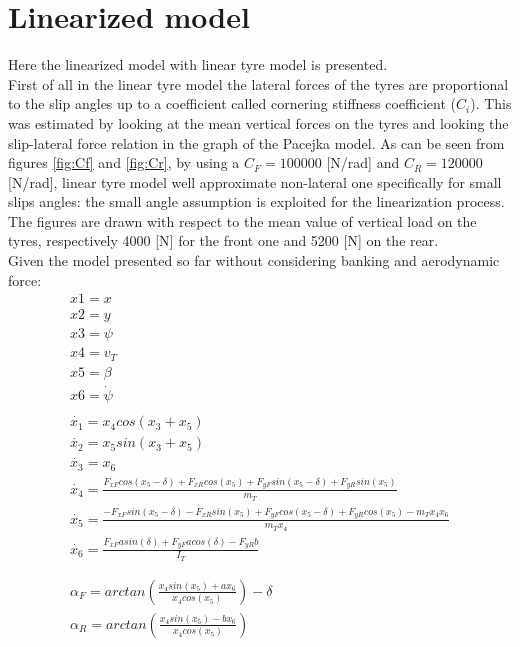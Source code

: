\documentclass{report}
\let\Oldsection\section
\renewcommand{\section}{\FloatBarrier\Oldsection}
\begin{document}
\section{Linearized model}
Here the linearized model with linear tyre model is presented.
\\First of all in the linear tyre model the lateral forces of the tyres are proportional to the slip angles up to a coefficient called cornering stiffness coefficient ($C_i$). This was estimated by looking at the mean vertical forces on the tyres and looking the slip-lateral force relation in the graph of the Pacejka model. As can be seen from figures \ref{fig:Cf} and \ref{fig:Cr}, by using a $C_F = 100000$ [N/rad] and $C_R = 120000$ [N/rad], linear tyre model well approximate non-lateral one specifically for small slips angles: the small angle assumption is exploited for the linearization process. The figures are drawn with respect to the mean value of vertical load on the tyres, respectively 4000 [N] for the front one and 5200 [N] on the rear.
\\Given the model presented so far without considering banking and aerodynamic force:
\begin{equation}
\begin{aligned}
x1 = x\\
x2 = y\\
x3 = \psi\\
x4 = v_T\\
x5 = \beta\\
x6 = \dot{\psi}\\\\
\dot{x_1} = x_4 cos(x_3 + x_5)\\
\dot{x_2} = x_5 sin(x_3 + x_5)\\
\dot{x_3} = x_6 \\
\dot{x_4} = \frac{F_{xF} cos(x_5-\delta) + F_{xR} cos(x_5) + F_{yF} sin(x_5-\delta) + F_{yR} sin(x_5)}{m_T} \\
\dot{x_5} = \frac{-F_{xF} sin(x_5-\delta) - F_{xR} sin(x_5) + F_{yF} cos(x_5-\delta) + F_{yR} cos(x_5) - m_T x_4 x_6}{m_T x_4} \\
\dot{x_6} = \frac{F_{xF} a sin(\delta) + F_{yF} a cos(\delta) - F_{yR} b}{I_T} \\\\\\
\alpha_F = arctan(\frac{x_4 sin(x_5) + ax_6}{x_4 cos(x_5)}) - \delta\\
\alpha_R = arctan(\frac{x_4 sin(x_5) - bx_6}{x_4 cos(x_5)}) \\\\
\end{aligned}
\end{equation}
\end{document}
